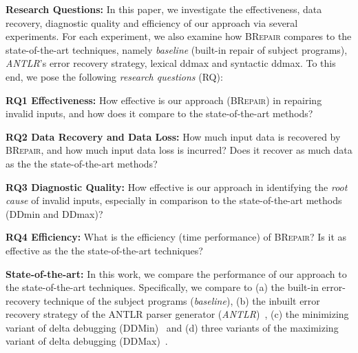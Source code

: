 \documentclass[sigconf,review,anonymous]{acmart}
\newcommand{\recheck}[1]{\textcolor{red}{#1}}
\newcommand{\revise}[1]{\textcolor{blue}{#1}}
\newcommand{\approach}{\textsc{BRepair}\xspace}
\begin{document}
\smallskip\noindent
\textbf{Research Questions: } 
In this paper, %
we investigate the effectiveness, data recovery, diagnostic quality and efficiency of our approach via several experiments. For each experiment, %
we also examine how \approach compares to the state-of-the-art techniques, namely \textit{baseline} (built-in repair of subject programs), \textit{ANTLR}'s error recovery strategy, lexical ddmax and syntactic ddmax.  
To this end, we pose the following \textit{research questions} (RQ):

\noindent
\textbf{RQ1 Effectiveness:}  %
How effective is our approach (\approach) in repairing invalid %
inputs, and how does it compare to the state-of-the-art methods? 

\noindent
\textbf{RQ2 Data Recovery and Data Loss:} 
How much input data is recovered by \approach, and how much input data loss is incurred?  Does it recover as much data as the 
the state-of-the-art methods?


\noindent
\textbf{RQ3 Diagnostic Quality:} 
How effective is our approach in identifying the \textit{root cause} of invalid inputs, especially in comparison to the state-of-the-art methods (DDmin and DDmax)?
%

\noindent
\textbf{RQ4 Efficiency:} %
What is the efficiency (time performance) of 
\approach? Is it as effective as the 
the state-of-the-art %
techniques?


\noindent
\textbf{State-of-the-art:} 
In this work, we compare the performance of our approach to the state-of-the-art techniques. Specifically, we compare to (a) the built-in error-recovery technique of the subject programs (\textit{baseline}), (b) the inbuilt error recovery strategy of the ANTLR parser generator (\textit{ANTLR})~\cite{}, (c) the minimizing variant of delta debugging (DDMin)~\cite{} and (d) three variants of the maximizing variant of delta debugging (DDMax)~\cite{kirschner2020debugging}.
\end{document}
